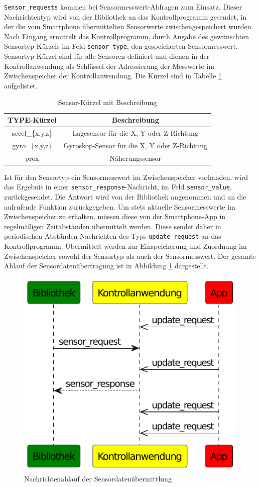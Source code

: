 \documentclass[11pt,a4paper]{report}
\begin{document}
\texttt{Sensor\_requests} kommen bei Sensormesswert-Abfragen zum Einsatz.
Dieser Nachrichtentyp wird von der Bibliothek an das Kontrollprogramm gesendet, in der die vom Smartphone übermittelten Sensorwerte zwischengespeichert wurden.
Nach Eingang ermittelt das Kontrollprogramm, durch Angabe des gewünschten Sensortyp-Kürzels im Feld \texttt{sensor\_type}, den gespeicherten Sensormesswert.
Sensortyp-Kürzel sind für alle Sensoren definiert und dienen in der Kontrollanwendung als Schlüssel der Adressierung der Messwerte im Zwischenspeicher der Kontrollanwendung.
Die Kürzel sind in Tabelle \ref{tab:sensor_types} aufgelistet. 
\begin{table}[htbp]
  \centering
  \begin{tabular}{|c|c|}
      \hline
      \textbf{TYPE-Kürzel} & \textbf{Beschreibung} \\
      \hline
      accel\_\{x,y,z\} & Lagesensor für die X, Y oder Z-Richtung \\
      \hline
       gyro\_\{x,y,z\} & Gyroskop-Sensor für die X, Y oder Z-Richtung \\
      \hline
      prox & Näherungssensor \\
      \hline
  \end{tabular}
  \caption{Sensor-Kürzel mit Beschreibung}
  \label{tab:sensor_types}
\end{table}
Ist für den Sensortyp ein Sensormesswert im Zwischenspeicher vorhanden, wird das Ergebnis in einer \texttt{sensor\_response}-Nachricht, im Feld \texttt{sensor\_value}, zurückgesendet.
Die Antwort wird von der Bibliothek angenommen und an die aufrufende Funktion zurückgegeben.
Um stets aktuelle Sensormesswerte im Zwischenspeicher zu erhalten, müssen diese von der Smartphone-App in regelmäßigen Zeitabständen übermittelt werden.
Diese sendet daher in periodischen Abständen Nachrichten des Typs \texttt{update\_request} an das Kontrollprogramm.
Übermittelt werden zur Einspeicherung und Zuordnung im Zwischenspeicher sowohl der Sensortyp als auch der Sensormesswert.
Der gesamte Ablauf der Sensordatenübertragung ist in Abbildung \ref{fig:message_flow_requests} dargestellt.
\begin{figure}[htbp]
\centering
\includegraphics[width=.5\textwidth]{images/message_flow_sensor}
\caption{Nachrichtenablauf der Sensordatenübermittlung}
\label{fig:message_flow_requests}
\end{figure}
\end{document}
